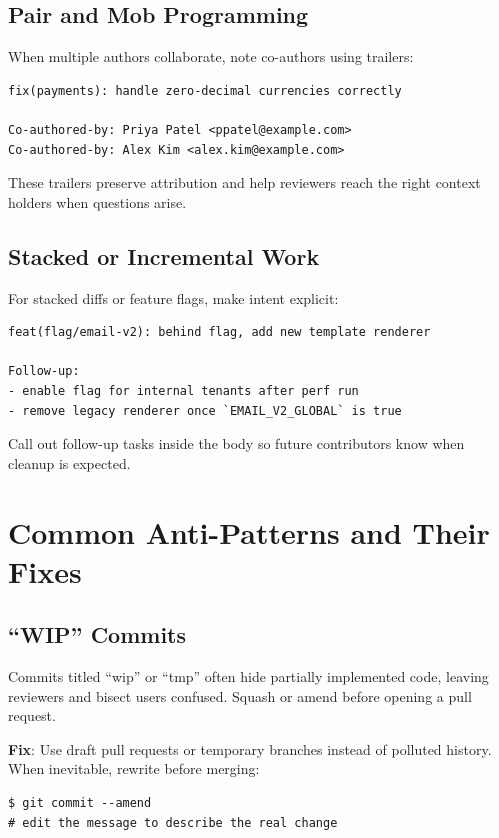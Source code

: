 \subsection{Pair and Mob Programming}
When multiple authors collaborate, note co-authors using trailers:
\begin{lstlisting}[style=markdown,caption={Including co-authors with trailers}]
fix(payments): handle zero-decimal currencies correctly

Co-authored-by: Priya Patel <ppatel@example.com>
Co-authored-by: Alex Kim <alex.kim@example.com>
\end{lstlisting}

These trailers preserve attribution and help reviewers reach the right context holders when questions arise.

\subsection{Stacked or Incremental Work}
For stacked diffs or feature flags, make intent explicit:
\begin{lstlisting}[style=markdown,caption={Clarifying incremental rollouts}]
feat(flag/email-v2): behind flag, add new template renderer

Follow-up:
- enable flag for internal tenants after perf run
- remove legacy renderer once `EMAIL_V2_GLOBAL` is true
\end{lstlisting}

Call out follow-up tasks inside the body so future contributors know when cleanup is expected.

\section{Common Anti-Patterns and Their Fixes}
\subsection{``WIP'' Commits}
\begin{warningbox}
Commits titled ``wip'' or ``tmp'' often hide partially implemented code, leaving reviewers and bisect users confused. Squash or amend before opening a pull request.
\end{warningbox}

\textbf{Fix}: Use draft pull requests or temporary branches instead of polluted history. When inevitable, rewrite before merging:
\begin{lstlisting}[style=shell,caption={Fixing low-signal commits}]
$ git commit --amend
# edit the message to describe the real change
\end{lstlisting}

